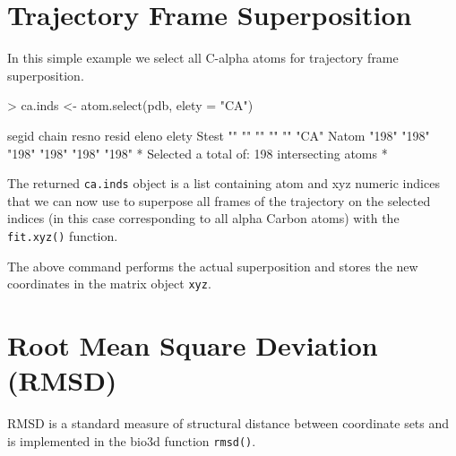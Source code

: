 \documentclass[letter]{article}
\begin{document}
\section{Trajectory Frame Superposition}
In this simple example we select all C-alpha atoms for trajectory frame superposition.
\begin{Schunk}
\begin{Sinput}
> ca.inds <- atom.select(pdb, elety = "CA")
\end{Sinput}
\begin{Soutput}
      segid chain resno resid eleno elety
Stest ""    ""    ""    ""    ""    "CA" 
Natom "198" "198" "198" "198" "198" "198"
 *  Selected a total of: 198 intersecting atoms  *
\end{Soutput}
\end{Schunk}
The returned \texttt{ca.inds} object is a list containing atom and xyz numeric indices that we can now use to superpose all frames of the trajectory on the selected indices (in this case corresponding to all alpha Carbon atoms) with the \texttt{fit.xyz()} function.
\begin{Schunk}
\end{Schunk}
The above command performs the actual superposition and stores the new coordinates in the matrix object \texttt{xyz}.

\section{Root Mean Square Deviation (RMSD)}
RMSD is a standard measure of structural distance between coordinate sets and is implemented in the bio3d function \texttt{rmsd()}.
\end{document}
